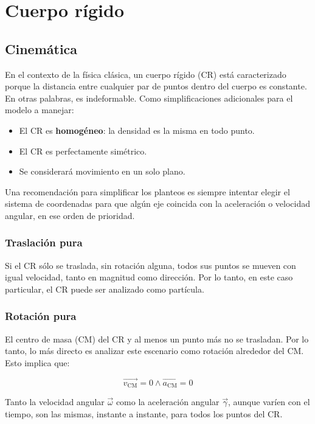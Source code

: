 \documentclass{article}
\begin{document}
\section{Cuerpo rígido}

\subsection{Cinemática}

En el contexto de la física clásica, un cuerpo rígido (CR) está caracterizado porque la distancia entre cualquier par de puntos dentro del cuerpo es constante. En otras palabras, es indeformable. Como simplificaciones adicionales para el modelo a manejar:

\begin{itemize}
\item El CR es \textbf{homogéneo}: la densidad es la misma en todo punto.
\item El CR es perfectamente simétrico.
\item Se considerará movimiento en un solo plano.
\end{itemize}

Una recomendación para simplificar los planteos es siempre intentar elegir el sistema de coordenadas para que algún eje coincida con la aceleración o velocidad angular, en ese orden de prioridad.

\subsubsection{Traslación pura}

Si el CR sólo se traslada, sin rotación alguna, todos sus puntos se mueven con igual velocidad, tanto en magnitud como dirección. Por lo tanto, en este caso particular, el CR puede ser analizado como partícula.

\subsubsection{Rotación pura}

El centro de masa (CM) del CR y al menos un punto más no se trasladan. Por lo tanto, lo más directo es analizar este escenario como rotación alrededor del CM. Esto implica que:

\begin{equation}
\overrightarrow{v_{\text{CM}}} = 0 \wedge \overrightarrow{a_{\text{CM}}} = 0
\end{equation}

Tanto la velocidad angular $\overrightarrow{\omega}$ como la aceleración angular $\overrightarrow{\gamma}$, aunque varíen con el tiempo, son las mismas, instante a instante, para todos los puntos del CR.
\end{document}
